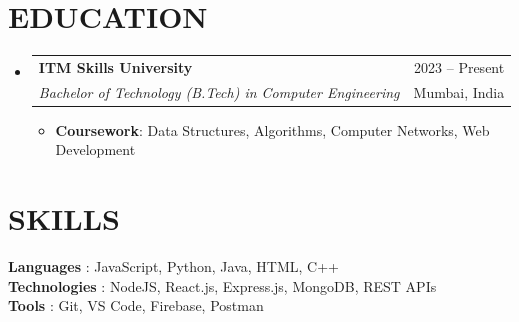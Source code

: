 \documentclass[letterpaper,11pt]{article}
\makeatletter
\newcommand{\resumeItem}[1]{
  \item\small{
    {#1 \vspace{-1pt}}
  }
}
\newcommand{\resumeSubheading}[4]{
  \vspace{-1pt}\item
    \begin{tabular*}{\textwidth}[t]{l@{\extracolsep{\fill}}r}
      \textbf{#1} & {\color{dark-grey}\small #2}\vspace{1pt}\\
      \textit{#3} & {\color{dark-grey} \small #4}\\
    \end{tabular*}\vspace{-4pt}
}
\newcommand{\resumeSubHeadingListStart}{\begin{itemize}[leftmargin=0in, label={}]}
\newcommand{\resumeSubHeadingListEnd}{\end{itemize}}
\newcommand{\resumeItemListStart}{\begin{itemize}}
\newcommand{\resumeItemListEnd}{\end{itemize}\vspace{0pt}}
\makeatother
\begin{document}
\section{EDUCATION}
  \resumeSubHeadingListStart
    \resumeSubheading
      {ITM Skills University}{2023 -- Present}
      {Bachelor of Technology (B.Tech) in Computer Engineering}{Mumbai, India}
      \resumeItemListStart
        \resumeItem {\textbf{Coursework}: Data Structures, Algorithms, Computer Networks, Web Development}
      \resumeItemListEnd
  \resumeSubHeadingListEnd

\section{SKILLS}
 \begin{itemize}[leftmargin=0in, label={}]
    \small{\item{
     \textbf{Languages} {: JavaScript, Python, Java, HTML, C++}\vspace{2pt} \\
     \textbf{Technologies} {: NodeJS, React.js, Express.js, MongoDB, REST APIs}\vspace{2pt} \\
     \textbf{Tools}     {: Git, VS Code, Firebase, Postman}
    }}
 \end{itemize}
\end{document}
